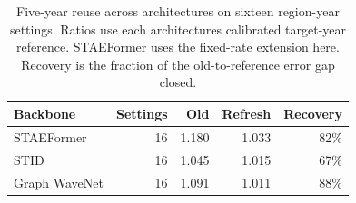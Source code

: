 \begin{table}[t]
\centering
\caption{Five-year reuse across architectures on sixteen region-year settings. Ratios use each architecture\textquotesingle s calibrated target-year reference. STAEFormer uses the fixed-rate extension here. Recovery is the fraction of the old-to-reference error gap closed.}
\label{tab:backbones}
\begin{tabular}{lrrrr}
\toprule
Backbone & Settings & Old & Refresh & Recovery \\
\midrule
STAEFormer & 16 & 1.180 & 1.033 & 82\% \\
STID & 16 & 1.045 & 1.015 & 67\% \\
Graph WaveNet & 16 & 1.091 & 1.011 & 88\% \\
\bottomrule
\end{tabular}
\end{table}
